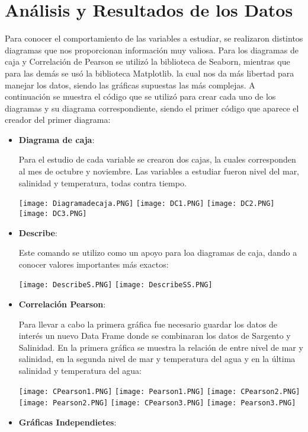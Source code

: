 \documentclass{article}
\begin{document}
\section{Análisis y Resultados de los Datos}
Para conocer el comportamiento de las variables a estudiar, se realizaron distintos diagramas que nos proporcionan información muy valiosa. Para los diagramas de caja y Correlación de Pearson se utilizó la biblioteca de Seaborn, mientras que para las demás se usó la biblioteca Matplotlib. la cual nos da más libertad para manejar los datos, siendo las gráficas supuestas las más complejas. A continuación se muestra el código que se utilizó para crear cada uno de los diagramas y su diagrama correspondiente, siendo el primer código que aparece el creador del primer diagrama:
\begin{itemize}
\item \textbf{Diagrama de caja}:


Para el estudio de cada variable se crearon dos cajas, la cuales corresponden al mes de octubre y noviembre. Las variables a estudiar fueron nivel del mar, salinidad y temperatura, todas contra tiempo.
\begin{center}
    \texttt{[image: Diagramadecaja.PNG]}
    \texttt{[image: DC1.PNG]}
    \texttt{[image: DC2.PNG]}
    \texttt{[image: DC3.PNG]}
\end{center}
\item \textbf{Describe}:


Este comando se utilizo como un apoyo para loa diagramas de caja, dando a conocer valores importantes más exactos:
\begin{center}
    \texttt{[image: DescribeS.PNG]}
    \texttt{[image: DescribeSS.PNG]}
\end{center}

\item \textbf{Correlación Pearson}:

Para llevar a cabo la primera gráfica fue necesario guardar los datos de interés un nuevo Data Frame donde se combinaran los datos de Sargento y Salinidad. En la primera gráfica se muestra la relación de entre nivel de mar y salinidad, en la segunda nivel de mar y temperatura del agua y en la última salinidad y temperatura del agua:
\begin{center}
    \texttt{[image: CPearson1.PNG]}
    \texttt{[image: Pearson1.PNG]}
    \texttt{[image: CPearson2.PNG]}
    \texttt{[image: Pearson2.PNG]}
    \texttt{[image: CPearson3.PNG]}
    \texttt{[image: Pearson3.PNG]}
\end{center}
\item \textbf{Gráficas Independietes}:



\end{itemize}
\end{document}
